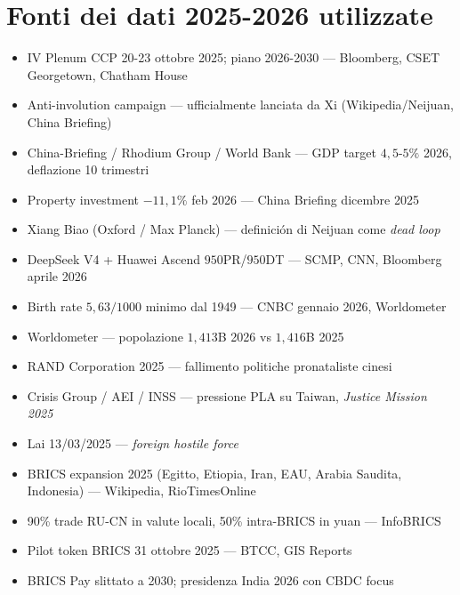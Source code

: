 \section{Fonti dei dati 2025-2026
utilizzate}\label{fonti-dei-dati-2025-2026-utilizzate}

\begin{itemize}
\tightlist
\item
  IV Plenum CCP 20-23 ottobre 2025; piano 2026-2030 --- Bloomberg, CSET
  Georgetown, Chatham House
\item
  Anti-involution campaign --- ufficialmente lanciata da Xi
  (Wikipedia/Neijuan, China Briefing)
\item
  China-Briefing / Rhodium Group / World Bank --- GDP target
  \(4{,}5\)-\(5\%\) 2026, deflazione 10 trimestri
\item
  Property investment \(-11{,}1\%\) feb 2026 --- China Briefing dicembre
  2025
\item
  Xiang Biao (Oxford / Max Planck) --- definición di Neijuan come
  \emph{dead loop}
\item
  DeepSeek V4 + Huawei Ascend \(950\)PR/\(950\)DT --- SCMP, CNN,
  Bloomberg aprile 2026
\item
  Birth rate \(5{,}63/1000\) minimo dal 1949 --- CNBC gennaio 2026,
  Worldometer
\item
  Worldometer --- popolazione \(1{,}413\)B 2026 vs \(1{,}416\)B 2025
\item
  RAND Corporation 2025 --- fallimento politiche pronataliste cinesi
\item
  Crisis Group / AEI / INSS --- pressione PLA su Taiwan, \emph{Justice
  Mission 2025}
\item
  Lai 13/03/2025 --- \emph{foreign hostile force}
\item
  BRICS expansion 2025 (Egitto, Etiopia, Iran, EAU, Arabia Saudita,
  Indonesia) --- Wikipedia, RioTimesOnline
\item
  90\% trade RU-CN in valute locali, 50\% intra-BRICS in yuan ---
  InfoBRICS
\item
  Pilot token BRICS 31 ottobre 2025 --- BTCC, GIS Reports
\item
  BRICS Pay slittato a 2030; presidenza India 2026 con CBDC focus
\end{itemize}


